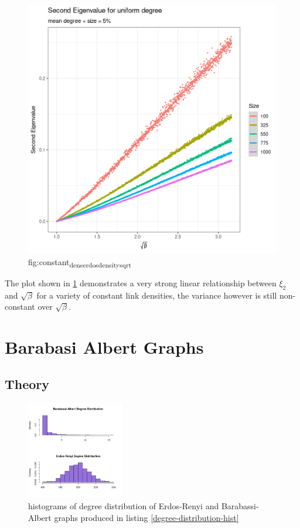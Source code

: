 \documentclass[11pt]{report}
\begin{document}
\begin{figure}[htbp]
\centering
\includegraphics[width=12cm]{media/constant_dens_erdos_density_sqrt.png}
\caption{\label{fig:constant_dens_erdos_density_sqrt}fig:constant\textsubscript{dens}\textsubscript{erdos}\textsubscript{density}\textsubscript{sqrt}}
\end{figure}


The plot shown in \ref{fig:constant_dens_erdos_density_sqrt}  demonstrates a very strong linear relationship between \(\xi_{2}\) and \(\sqrt{\beta}\) for a variety of constant link densities, the variance however is still non-constant over \(\sqrt{\beta}\).

\section{Barabasi Albert Graphs}
\label{barabassi-albert}
\subsection{Theory}
\label{sec:org295fb32}


\begin{figure}
\includegraphics[width=0.38\textwidth]{media/degree_dist_er_ba.png}
\caption{\label{fig:degree-distribution-hist}histograms of degree distribution of Erdos-Renyi and Barabassi-Albert graphs produced in listing \ref{degree-distribution-hist}}
\end{figure}
\end{document}
